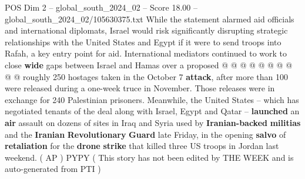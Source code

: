 \begin{textsample}{POS Dim 2 – global\_south\_2024\_02 – Score 18.00 – global\_south\_2024\_02/105630375.txt}
While the statement alarmed aid officials and international diplomats, Israel would risk significantly disrupting strategic relationships with the United States and Egypt if it were to send troops into Rafah, a key entry point for aid.
International mediators continued to work to close \textbf{wide} gaps between Israel and Hamas over a proposed @ @ @ @ @ @ @ @ @ @ roughly 250 hostages taken in the October 7 \textbf{attack}, after more than 100 were released during a one-week truce in November.
Those releases were in exchange for 240 Palestinian prisoners.
Meanwhile, the United States -- which has negotiated tenants of the deal along with Israel, Egypt and Qatar -- \textbf{launched} an \textbf{air} assault on dozens of sites in Iraq and Syria used by \textbf{Iranian-backed} \textbf{militias} and the \textbf{Iranian} \textbf{Revolutionary} \textbf{Guard} late Friday, in the opening \textbf{salvo} of \textbf{retaliation} for the \textbf{drone} \textbf{strike} that killed three US troops in Jordan last weekend. ( AP ) PYPY ( This story has not been edited by THE WEEK and is auto-generated from PTI )

\end{textsample}
